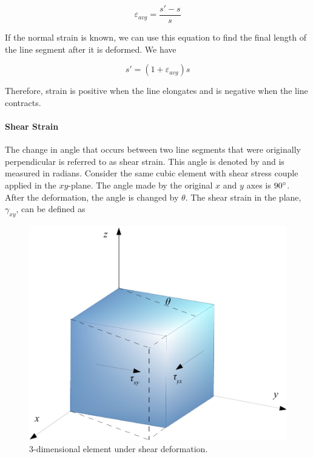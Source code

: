 \documentclass[
10pt,
a4paper,
openany,
svgnames,
]{book} %
\begin{document}
\begin{equation}
  \varepsilon _{avg} = \frac{s' - s}{s}
\end{equation}

If the normal strain is known, we can use this equation to find the final length of the line segment after it is deformed. We have

\begin{equation}
  s' = (1 + \varepsilon _{avg})s
\end{equation}

Therefore, strain is positive when the line elongates and is negative when the line contracts.

\paragraph{Shear Strain} The change in angle that occurs between two line segments that were originally perpendicular is referred to as shear strain. This angle is denoted by and is measured in radians. Consider the same cubic element with shear stress couple applied in the $xy$-plane. The angle made by the original $x$ and $y$ axes is $90\degree$. After the deformation, the angle is changed by $\theta$. The shear strain in the plane, $\gamma_{xy}$, can be defined as 

\begin{figure}[h]
  \centering
  \includegraphics[scale=0.5]{pictures/Static-body-load-analysis/3d-shear-deformation}
  \caption{3-dimensional element under shear deformation.}
  \label{fig: 3d shear deformation}
\end{figure}
\end{document}
